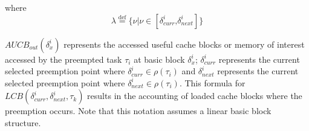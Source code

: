 \noindent
where
\begin{equation*}\label{eqn:lcb-formula-1b}
    \lambda \stackrel{\text{def}}{=} \{ \nu|\nu \in [ \delta_{curr}^{i} \text{,} \delta_{next}^{i} ] \}
\end{equation*}

\noindent
\begin{math}\textit{AUCB}_{out}(\delta_{x}^{i})\end{math} represents the accessed useful cache blocks or memory of interest accessed by the preempted task \begin{math}\tau_{i}\end{math} at basic block \begin{math}\delta_{x}^{i}\end{math}; \begin{math}\delta_{curr}^{i}\end{math} represents the current selected preemption point where \begin{math}\delta_{curr}^{i} \in \rho(\tau_{i})\end{math} and \begin{math}\delta_{next}^{i}\end{math} represents the current selected preemption point where \begin{math}\delta_{next}^{i} \in \rho(\tau_{i})\end{math}.  This formula for \begin{math}\textit{LCB}(\delta_{curr}^{i},\delta_{next}^{i},\tau_{k})\end{math} results in the accounting of loaded cache blocks where the preemption occurs.  Note that this notation assumes a linear basic block structure.
\newline
\newline
